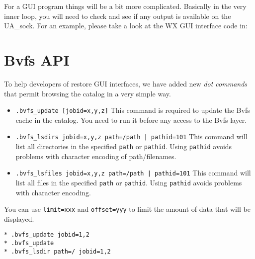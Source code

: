 For a GUI program things will be a bit more complicated. Basically in the very
inner loop, you will need to check and see if any output is available on the
UA\_sock. For an example, please take a look at the WX GUI interface code
in: 

\section{Bvfs API}
\label{sec:bvfs}

To help developers of restore GUI interfaces, we have added new \textsl{dot
  commands} that permit browsing the catalog in a very simple way.

\begin{itemize}
\item \texttt{.bvfs\_update [jobid=x,y,z]} This command is required to update
  the Bvfs cache in the catalog. You need to run it before any access to the
  Bvfs layer.

\item \texttt{.bvfs\_lsdirs jobid=x,y,z path=/path | pathid=101} This command
  will list all directories in the specified \texttt{path} or
  \texttt{pathid}. Using \texttt{pathid} avoids problems with character
  encoding of path/filenames.

\item \texttt{.bvfs\_lsfiles jobid=x,y,z path=/path | pathid=101} This command
  will list all files in the specified \texttt{path} or \texttt{pathid}. Using
  \texttt{pathid} avoids problems with character encoding.
\end{itemize}

You can use \texttt{limit=xxx} and \texttt{offset=yyy} to limit the amount of
data that will be displayed.

\begin{verbatim}
* .bvfs_update jobid=1,2
* .bvfs_update
* .bvfs_lsdir path=/ jobid=1,2
\end{verbatim}
